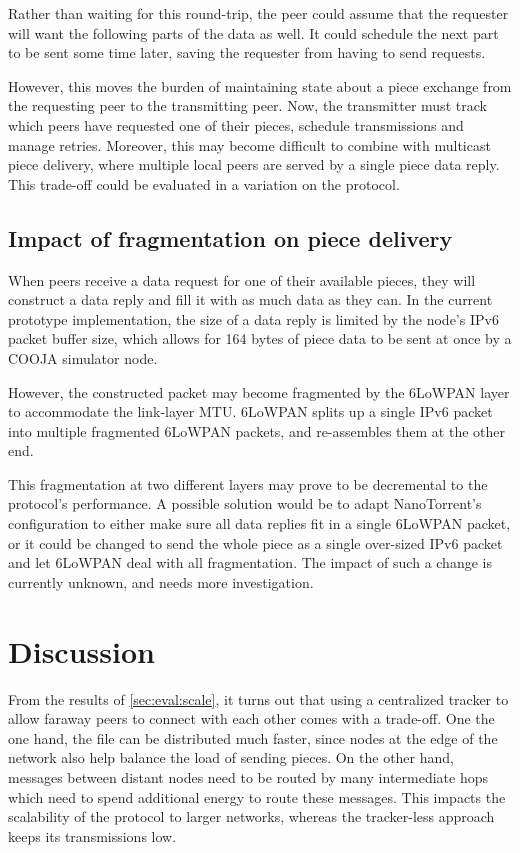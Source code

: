 Rather than waiting for this round-trip, the peer could assume that the requester will want the following parts of the data as well. It could schedule the next part to be sent some time later, saving the requester from having to send requests.

However, this moves the burden of maintaining state about a piece exchange from the requesting peer to the transmitting peer. Now, the transmitter must track which peers have requested one of their pieces, schedule transmissions and manage retries. Moreover, this may become difficult to combine with multicast piece delivery, where multiple local peers are served by a single piece data reply. This trade-off could be evaluated in a variation on the protocol.

\subsection{Impact of fragmentation on piece delivery}
When peers receive a data request for one of their available pieces, they will construct a data reply and fill it with as much data as they can. In the current prototype implementation, the size of a data reply is limited by the node's \gls{IPv6} packet buffer size, which allows for 164 bytes of piece data to be sent at once by a COOJA simulator node.

However, the constructed packet may become fragmented by the \gls{6LoWPAN} layer to accommodate the link-layer \gls{MTU}. \gls{6LoWPAN} splits up a single \gls{IPv6} packet into multiple fragmented \gls{6LoWPAN} packets, and re-assembles them at the other end.

This fragmentation at two different layers may prove to be decremental to the protocol's performance. A possible solution would be to adapt NanoTorrent's configuration to either make sure all data replies fit in a single \gls{6LoWPAN} packet, or it could be changed to send the whole piece as a single over-sized \gls{IPv6} packet and let \gls{6LoWPAN} deal with all fragmentation. The impact of such a change is currently unknown, and needs more investigation.

\section{Discussion}
\label{sec:eval:discussion}
From the results of \ref{sec:eval:scale}, it turns out that using a centralized tracker to allow faraway peers to connect with each other comes with a trade-off. One the one hand, the file can be distributed much faster, since nodes at the edge of the network also help balance the load of sending pieces. On the other hand, messages between distant nodes need to be routed by many intermediate hops which need to spend additional energy to route these messages. This impacts the scalability of the protocol to larger networks, whereas the tracker-less approach keeps its transmissions low.

